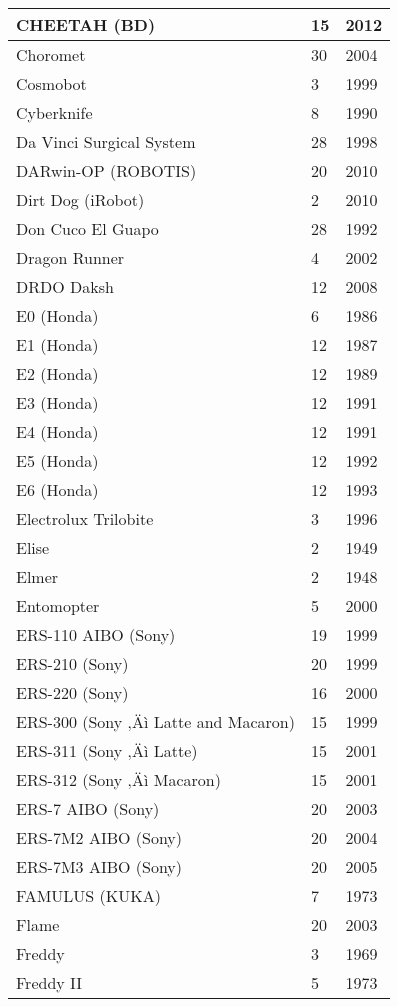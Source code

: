 \begin{center}
\begin{longtable}{l | l | l }
CHEETAH (BD)	&	15	&	2012	\\	\hline
Choromet	&	30	&	2004	\\	\hline
Cosmobot	&	3	&	1999	\\	\hline
Cyberknife	&	8	&	1990	\\	\hline
Da Vinci Surgical System \cite{robotdavinci}	&	28	&	1998	\\	\hline
DARwin-OP (ROBOTIS)	&	20	&	2010	\\	\hline
Dirt Dog (iRobot)	&	2	&	2010	\\	\hline
Don Cuco El Guapo	&	28	&	1992	\\	\hline
Dragon Runner	&	4	&	2002	\\	\hline
DRDO Daksh	&	12	&	2008	\\	\hline
E0 (Honda)	&	6	&	1986	\\	\hline
E1 (Honda)	&	12	&	1987	\\	\hline
E2 (Honda)	&	12	&	1989	\\	\hline
E3 (Honda)	&	12	&	1991	\\	\hline
E4 (Honda)	&	12	&	1991	\\	\hline
E5 (Honda) 	&	12	&	1992	\\	\hline
E6 (Honda)	&	12	&	1993	\\	\hline
Electrolux Trilobite	&	3	&	1996	\\	\hline
Elise \cite{robotElmer}	&	2	&	1949	\\	\hline
Elmer \cite{robotElmer} &	2	&	1948	\\	\hline
Entomopter	&	5	&	2000	\\	\hline
ERS-110 AIBO (Sony)	&	19	&	1999	\\	\hline
ERS-210 (Sony)	&	20	&	1999	\\	\hline
ERS-220 (Sony)	&	16	&	2000	\\	\hline
ERS-300 (Sony ‚Äì Latte and Macaron)	&	15	&	1999	\\	\hline
ERS-311 (Sony ‚Äì Latte)	&	15	&	2001	\\	\hline
ERS-312 (Sony ‚Äì Macaron)	&	15	&	2001	\\	\hline
ERS-7 AIBO (Sony)	&	20	&	2003	\\	\hline
ERS-7M2 AIBO (Sony)	&	20	&	2004	\\	\hline
ERS-7M3 AIBO (Sony)	&	20	&	2005	\\	\hline
FAMULUS (KUKA)	&	7	&	1973	\\	\hline
Flame	&	20	&	2003	\\	\hline
Freddy	&	3	&	1969	\\	\hline
Freddy II	&	5	&	1973	\\	\hline

\end{longtable}
\end{center}
